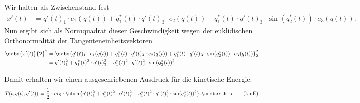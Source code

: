 \documentclass{subfiles}
\begin{document}
    Wir halten als Zwischenstand fest 
    \begin{align*}
        x'(t) &= q'(t)_1\cdot e_1(q(t)) + q_1^*(t)\cdot q'(t)_3\cdot e_2(q(t)) + q_1^*(t)\cdot q'(t)_3\cdot\sin(q_2^*(t))\cdot e_3(q(t)).
    \end{align*}
    Nun ergibt sich als Normquadrat dieser Geschwindigkeit wegen der euklidischen Orthonormalität der Tangenteneinheitsvektoren
    \begin{align*}
        \dabs{x'(t)}{2}^2 &= \dabs{q'(t)_1\cdot e_1(q(t)) + q_1^*(t)\cdot q'(t)_3\cdot e_2(q(t)) + q_1^*(t)\cdot q'(t)_3\cdot\sin(q_2^*(t))\cdot e_3(q(t))}_2^2\\
        &= q'(t)_1^2 +q_1^*(t)^2\cdot q'(t)_3^2 + q_1^*(t)^2\cdot q'(t)_3^2\cdot\sin(q_2^*(t))^2
    \end{align*}
    \begin{ergebnis}
        Damit erhalten wir einen ausgeschriebenen Ausdruck für die kinetische Energie:
        \[
            T(t,q(t),q'(t)) = \frac{1}{2}\cdot m_S\cdot\nbra{q'(t)_1^2 + q_1^*(t)^2\cdot q'(t)_2^2 + q_1^*(t)^2\cdot q'(t)_3^2\cdot\sin(q_2^*(t))^2}.\numberthis\label{eq:kinE}\tag{kinE}
        \]
    \end{ergebnis}
\end{document}
